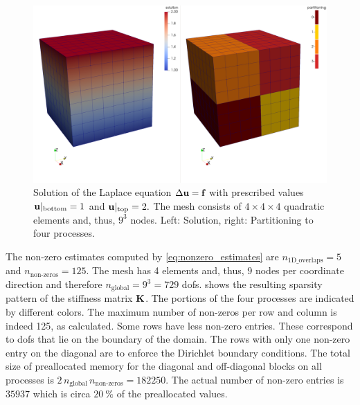 \begin{figure}%
  \centering%
  \includegraphics[width=\textwidth]{images/implementation/3d_laplace.png}%
  \caption{Solution of the Laplace equation $ \Delta\textbf{u} = \textbf{f}$ with prescribed values $\textbf{u}|_\text{bottom}=1$ and $\textbf{u}|_\text{top}=2.$ The mesh consists of $4\times 4\times 4$ quadratic elements and, thus, $9^3$ nodes. Left: Solution, right: Partitioning to four processes.}
  \label{fig:3d_laplace}%
\end{figure}%

The non-zero estimates computed by \cref{eq:nonzero_estimates} are $n_\text{1D\_overlaps}=5$ and $n_\text{non-zeros} = 125$. The mesh has 4 elements and, thus, 9 nodes per coordinate direction and therefore $n_\text{global} = 9^3 = 729$ dofs.
 shows the resulting sparsity pattern of the stiffness matrix $\textbf{K}$. The portions of the four processes are indicated by different colors. The maximum number of non-zeros per row and column is indeed 125, as calculated. Some rows have less non-zero entries. These correspond to dofs that lie on the boundary of the domain. The rows with only one non-zero entry on the diagonal are to enforce the Dirichlet boundary conditions. 
The total size of preallocated memory for the diagonal and off-diagonal blocks on all processes is $2\,n_\text{global}\,n_\text{non-zeros} = \num{182250}$. The actual number of non-zero entries is $\num{35937}$ which is circa $\SI{20}{\percent}$ of the preallocated values.


